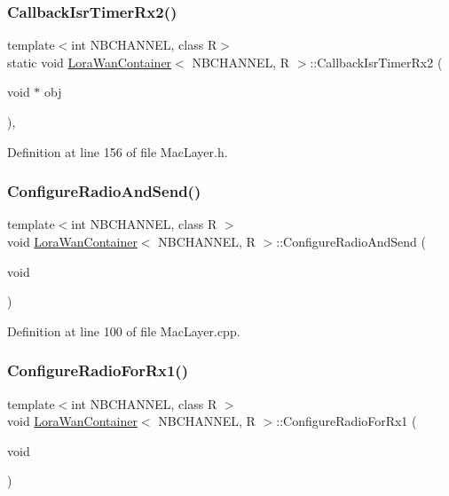 \subsubsection{\texorpdfstring{Callback\+Isr\+Timer\+Rx2()}{CallbackIsrTimerRx2()}}
{\footnotesize\ttfamily template$<$int N\+B\+C\+H\+A\+N\+N\+EL, class R$>$ \\
static void \mbox{\hyperlink{class_lora_wan_container}{Lora\+Wan\+Container}}$<$ N\+B\+C\+H\+A\+N\+N\+EL, R $>$\+::Callback\+Isr\+Timer\+Rx2 (\begin{DoxyParamCaption}\item[{void $\ast$}]{obj }\end{DoxyParamCaption})\hspace{0.3cm}{\ttfamily [inline]}, {\ttfamily [static]}}



Definition at line 156 of file Mac\+Layer.\+h.

\mbox{\label{class_lora_wan_container_ac9a6098c71b551eccdea9b1f29f50c96}} 
\subsubsection{\texorpdfstring{Configure\+Radio\+And\+Send()}{ConfigureRadioAndSend()}}
{\footnotesize\ttfamily template$<$int N\+B\+C\+H\+A\+N\+N\+EL, class R $>$ \\
void \mbox{\hyperlink{class_lora_wan_container}{Lora\+Wan\+Container}}$<$ N\+B\+C\+H\+A\+N\+N\+EL, R $>$\+::Configure\+Radio\+And\+Send (\begin{DoxyParamCaption}\item[{void}]{ }\end{DoxyParamCaption})}



Definition at line 100 of file Mac\+Layer.\+cpp.

\mbox{\label{class_lora_wan_container_a5c438e86f462a461cbc244054a2c27bb}} 
\subsubsection{\texorpdfstring{Configure\+Radio\+For\+Rx1()}{ConfigureRadioForRx1()}}
{\footnotesize\ttfamily template$<$int N\+B\+C\+H\+A\+N\+N\+EL, class R $>$ \\
void \mbox{\hyperlink{class_lora_wan_container}{Lora\+Wan\+Container}}$<$ N\+B\+C\+H\+A\+N\+N\+EL, R $>$\+::Configure\+Radio\+For\+Rx1 (\begin{DoxyParamCaption}\item[{void}]{ }\end{DoxyParamCaption})}



